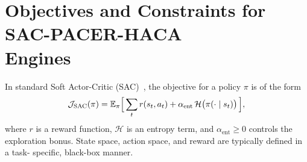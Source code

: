 \documentclass[11pt]{book}
\theoremstyle{plain}
\theoremstyle{definition}
\theoremstyle{remark}
\begin{document}
\section[Objectives and Constraints for SAC-PACER-HACA]{Objectives and Constraints for SAC-PACER-HACA \\Engines}


In standard Soft Actor-Critic (SAC)~\cite{Haarnoja2018SAC}, the objective for a policy $\pi$ is of the form
\[
  \mathcal{J}_{\mathrm{SAC}}(\pi)
  =
  \mathbb{E}_\pi
  \Bigl[\,
    \sum_{t} r(s_t,a_t)
    + \alpha_{\mathrm{ent}}\,\mathcal{H}\bigl(\pi(\cdot\mid s_t)\bigr)
  \,\Bigr],
\]
where $r$ is a reward function, $\mathcal{H}$ is an entropy term, and
$\alpha_{\mathrm{ent}}\ge 0$ controls the exploration bonus. State
space, action space, and reward are typically defined in a task-
specific, black-box manner.
\end{document}
